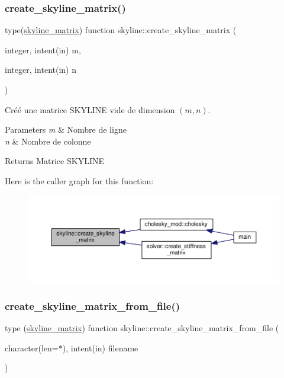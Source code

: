 \subsubsection{\texorpdfstring{create\+\_\+skyline\+\_\+matrix()}{create\_skyline\_matrix()}}
{\footnotesize\ttfamily type(\hyperlink{structskyline_1_1skyline__matrix}{skyline\+\_\+matrix}) function skyline\+::create\+\_\+skyline\+\_\+matrix (\begin{DoxyParamCaption}\item[{integer, intent(in)}]{m,  }\item[{integer, intent(in)}]{n }\end{DoxyParamCaption})}



Créé une matrice S\+K\+Y\+L\+I\+NE vide de dimension $(m,n)$. 


\begin{DoxyParams}{Parameters}
{\em m} & Nombre de ligne \\
\hline
{\em n} & Nombre de colonne \\
\hline
\end{DoxyParams}
\begin{DoxyReturn}{Returns}
Matrice S\+K\+Y\+L\+I\+NE 
\end{DoxyReturn}
Here is the caller graph for this function\+:\nopagebreak
\begin{figure}[H]
\begin{center}
\leavevmode
\includegraphics[width=350pt]{namespaceskyline_a5fe1d351df2e3a07f96028d1d2a892a8_icgraph}
\end{center}
\end{figure}
\mbox{\label{namespaceskyline_a86a4fe28bc106ef42d25cf7596c108bf}} 
\subsubsection{\texorpdfstring{create\+\_\+skyline\+\_\+matrix\+\_\+from\+\_\+file()}{create\_skyline\_matrix\_from\_file()}}
{\footnotesize\ttfamily type (\hyperlink{structskyline_1_1skyline__matrix}{skyline\+\_\+matrix}) function skyline\+::create\+\_\+skyline\+\_\+matrix\+\_\+from\+\_\+file (\begin{DoxyParamCaption}\item[{character(len=$\ast$), intent(in)}]{filename }\end{DoxyParamCaption})}



